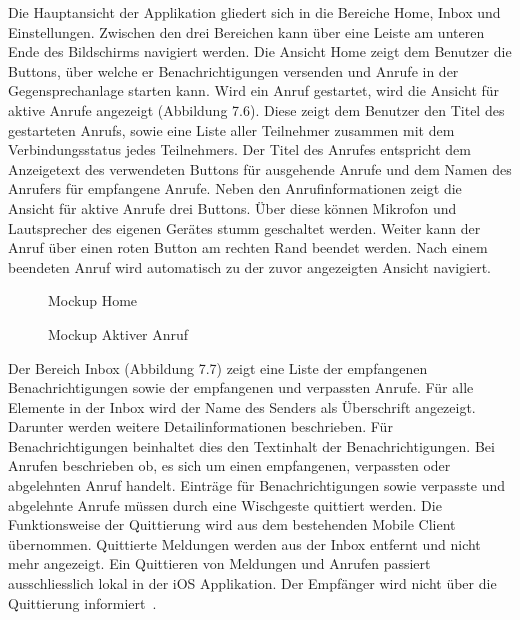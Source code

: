Die Hauptansicht der Applikation gliedert sich in die Bereiche Home, Inbox und Einstellungen.
Zwischen den drei Bereichen kann über eine Leiste am unteren Ende des Bildschirms navigiert werden.
Die Ansicht Home zeigt dem Benutzer die Buttons, über welche er Benachrichtigungen versenden und Anrufe in der Gegensprechanlage starten kann.
Wird ein Anruf gestartet, wird die Ansicht für aktive Anrufe angezeigt (Abbildung 7.6).
Diese zeigt dem Benutzer den Titel des gestarteten Anrufs, sowie eine Liste aller Teilnehmer zusammen mit dem Verbindungsstatus jedes Teilnehmers.
Der Titel des Anrufes entspricht dem Anzeigetext des verwendeten Buttons für ausgehende Anrufe und dem Namen des Anrufers für empfangene Anrufe.
Neben den Anrufinformationen zeigt die Ansicht für aktive Anrufe drei Buttons.
Über diese können Mikrofon und Lautsprecher des eigenen Gerätes stumm geschaltet werden.
Weiter kann der Anruf über einen roten Button am rechten Rand beendet werden.
Nach einem beendeten Anruf wird automatisch zu der zuvor angezeigten Ansicht navigiert.

\begin{figure}[h]
    \centering
    \begin{minipage}[b]{0.4\textwidth}
        \caption{Mockup Home}
    \end{minipage}
    \hfill
    \begin{minipage}[b]{0.4\textwidth}
        \caption{Mockup Aktiver Anruf}
    \end{minipage}\label{fig:Mockups-Home-ActiveCall}
\end{figure}

Der Bereich Inbox (Abbildung 7.7) zeigt eine Liste der empfangenen Benachrichtigungen sowie der empfangenen und verpassten Anrufe.
Für alle Elemente in der Inbox wird der Name des Senders als Überschrift angezeigt.
Darunter werden weitere Detailinformationen beschrieben.
Für Benachrichtigungen beinhaltet dies den Textinhalt der Benachrichtigungen.
Bei Anrufen beschrieben ob, es sich um einen empfangenen, verpassten oder abgelehnten Anruf handelt.
Einträge für Benachrichtigungen sowie verpasste und abgelehnte Anrufe müssen durch eine Wischgeste quittiert werden.
Die Funktionsweise der Quittierung wird aus dem bestehenden Mobile Client übernommen.
Quittierte Meldungen werden aus der Inbox entfernt und nicht mehr angezeigt.
Ein Quittieren von Meldungen und Anrufen passiert ausschliesslich lokal in der iOS Applikation.
Der Empfänger wird nicht über die Quittierung informiert~\cite{ip5}.

